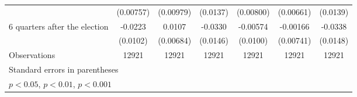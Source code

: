 \begin{table}[!ht]
\begin{tabular}{l*{6}{c}}
                    &   (0.00757)         &   (0.00979)         &    (0.0137)         &   (0.00800)         &   (0.00661)         &    (0.0139)         \\
[1em]
 6 quarters after the election&     -0.0223\sym{*}  &      0.0107         &     -0.0330\sym{*}  &    -0.00574         &    -0.00166         &     -0.0338\sym{*}  \\
                    &    (0.0102)         &   (0.00684)         &    (0.0146)         &    (0.0100)         &   (0.00741)         &    (0.0148)         \\
\hline
Observations        &       12921         &       12921         &       12921         &       12921         &       12921         &       12921         \\
\hline\hline
\multicolumn{7}{l}{\footnotesize Standard errors in parentheses}\\
\multicolumn{7}{l}{\footnotesize \sym{*} \(p<0.05\), \sym{**} \(p<0.01\), \sym{***} \(p<0.001\)}\\
\end{tabular}
\end{table}
